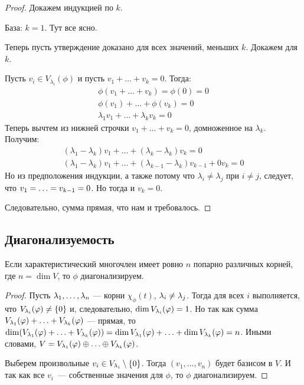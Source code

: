 \begin{proof}
Докажем индукцией по $k$.

База: $k = 1$. Тут все ясно.

Теперь пусть утверждение доказано для всех значений, меньших $k$. Докажем для $k$.

Пусть $v_i \in V_{\lambda_i}(\phi)$ и пусть $v_1 + \ldots + v_k = 0$. Тогда:
\begin{gather*}
\phi(v_1 + \ldots + v_k) = \phi(0) = 0 \\
\phi(v_1) + \ldots + \phi(v_k) = 0 \\
\lambda_1v_1 + \ldots + \lambda_kv_k = 0
\end{gather*}
Теперь вычтем из нижней строчки $v_1 + \ldots + v_k = 0$, домноженное на $\lambda_k$. Получим:
\begin{gather*}
(\lambda_1 - \lambda_k)v_1 + \ldots + (\lambda_k -\lambda_k)v_k = 0 \\
(\lambda_1 - \lambda_k)v_1 + \ldots + (\lambda_{k-1} -\lambda_k)v_{k-1} + 0v_k= 0
\end{gather*}
Но из предположения индукции, а также потому что $\lambda_i \neq \lambda_j$ при $i \neq j$, следует, что $v_1 = \ldots \hm= v_{k-1} = 0$. Но тогда и $v_k = 0$. 

Следовательно, сумма прямая, что нам и требовалось.
\end{proof}

\subsection*{Диагонализуемость}

\begin{Consequence}
Если характеристический многочлен имеет ровно $n$ попарно различных корней, где $n = \dim V$, то $\phi$ диагонализируем.
\end{Consequence}

\begin{proof}
Пусть $\lambda_1, \ldots, \lambda_n$ --- корни $\chi_\phi(t)$, $\lambda_i \neq \lambda_j$. Тогда для всех $i$ выполняется, что $V_{\lambda_i}(\varphi) \neq \{0\}$ и, следовательно, $\dim V_{\lambda_i}(\varphi) = 1$. Но так как сумма $V_{\lambda_1}(\varphi) + \ldots + V_{\lambda_k}(\varphi)$ --- прямая, то $\dim (V_{\lambda_1}(\varphi) + \ldots + V_{\lambda_k}(\varphi)) = \dim V_{\lambda_1}(\varphi) + \ldots + \dim V_{\lambda_k}(\varphi) = n$. Иными словами, $V = V_{\lambda_1}(\varphi) \oplus \ldots \oplus V_{\lambda_k}(\varphi)$.

Выберем произвольные $v_i \in V_{\lambda_i}\setminus\{0\}$. Тогда $(v_1, \ldots, v_n)$ будет базисом в $V$. И так как все $v_i$~--- собственные значения для $\phi$, то $\phi$ диагонализируем.
\end{proof}

